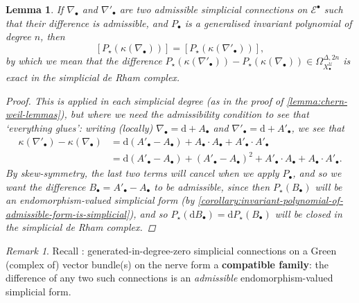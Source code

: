 \documentclass[11pt,fleqn]{article}
\theoremstyle{plain}
\newtheorem{lemma}[theorem]{Lemma}
\theoremstyle{definition}
\theoremstyle{remark}
\newtheorem{remark}[theorem]{Remark}
\numberwithin{equation}{theorem}
\newcommand{\cover}{\mathcal{U}}
\newcommand{\anotherbullet}{\star}
\newcommand{\define}[1]{\textbf{#1}}
\newcommand{\nerve}[1]{X_{#1}^\cover}
\renewcommand{\d}{\mathrm{d}}
\begin{document}
        \begin{lemma}\label{lemma:admissible-compatible-gives-exact}
            If $\nabla_\bullet$ and $\nabla'_\bullet$ are two admissible simplicial connections on $\mathcal{E}^\bullet$ such that their difference is admissible, and $P_\bullet$ is a generalised invariant polynomial of degree $n$, then
            \[
                [P_\anotherbullet(\kappa(\nabla_\bullet))]
                =
                [P_\anotherbullet(\kappa(\nabla'_\bullet))],
            \]
            by which we mean that the difference $P_\anotherbullet(\kappa(\nabla'_\bullet)) - P_\anotherbullet(\kappa(\nabla_\bullet)) \in \Omega_{\nerve{\bullet}}^{\Delta,2n}$ is exact in the simplicial de Rham complex.

            \begin{proof}
                This is \cite[Lemma~4.4.6]{Huybrechts2005} applied in each simplicial degree (as in the proof of \cref{lemma:chern-weil-lemmas}), but where we need the admissibility condition to see that `everything glues': writing (locally) $\nabla_\bullet = \d+A_\bullet$ and $\nabla'_\bullet = \d+A'_\bullet$, we see that
                \begin{align*}
                    \kappa(\nabla'_\bullet) - \kappa(\nabla_\bullet)
                    &= \d(A'_\bullet - A_\bullet) + A_\bullet\cdot A_\bullet + A'_\bullet\cdot A'_\bullet
                \\  &= \d(A'_\bullet - A_\bullet) + (A'_\bullet - A_\bullet)^2 + A'_\bullet\cdot A_\bullet + A_\bullet\cdot A'_\bullet.
                \end{align*}
                By skew-symmetry, the last two terms will cancel when we apply $P_\bullet$, and so we want the difference $B_\bullet = A'_\bullet - A_\bullet$ to be \emph{admissible}, since then $P_\anotherbullet(B_\bullet)$ will be an endomorphism-valued simplicial form (by \cref{corollary:invariant-polynomial-of-admissible-form-is-simplicial}), and so $P_\anotherbullet(\d B_\bullet) = \d P_\anotherbullet(B_\bullet)$ will be closed in the simplicial de Rham complex.
            \end{proof}
        \end{lemma}

        \begin{remark}\label{remark:gidz-on-green-is-compatible}
            Recall \cite[Lemma~3.5.7]{Hosgood2020a}: generated-in-degree-zero simplicial connections on a Green (complex of) vector bundle(s) on the nerve form a \define{compatible family}: the difference of any two such connections is an \emph{admissible} endomorphism-valued simplicial form.
        \end{remark}
\end{document}

